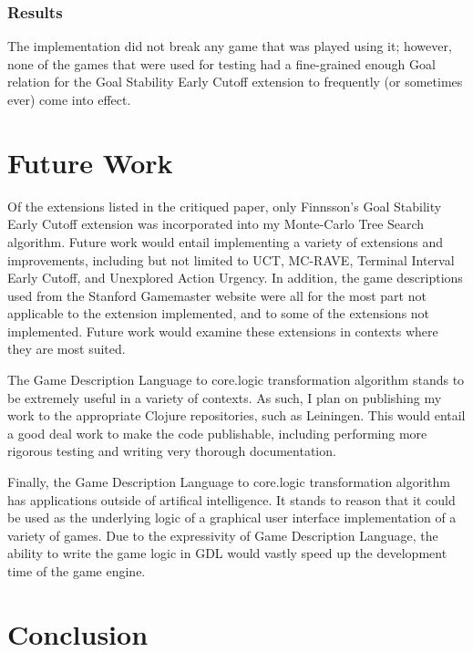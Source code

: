 \documentclass[letterpaper]{article}
\begin{document}
\subsubsection{Results}
The implementation did not break any game that was played using it; however, none of the games that were used for testing had a fine-grained enough Goal relation for the Goal Stability Early Cutoff extension to frequently (or sometimes ever) come into effect.

\section{Future Work}

Of the extensions listed in the critiqued paper, only Finnsson's Goal Stability Early Cutoff extension was incorporated into my Monte-Carlo Tree Search algorithm. Future work would entail implementing a variety of extensions and improvements, including but not limited to UCT, MC-RAVE, Terminal Interval Early Cutoff, and Unexplored Action Urgency. In addition, the game descriptions used from the Stanford Gamemaster website were all for the most part not applicable to the extension implemented, and to some of the extensions not implemented. Future work would examine these extensions in contexts where they are most suited.

The Game Description Language to core.logic transformation algorithm stands to be extremely useful in a variety of contexts. As such, I plan on publishing my work to the appropriate Clojure repositories, such as Leiningen. This would entail a good deal work to make the code publishable, including performing more rigorous testing and writing very thorough documentation.

Finally, the Game Description Language to core.logic transformation algorithm has applications outside of artifical intelligence. It stands to reason that it could be used as the underlying logic of a graphical user interface implementation of a variety of games. Due to the expressivity of Game Description Language, the ability to write the game logic in GDL would vastly speed up the development time of the game engine.

\section{Conclusion}



\end{document}
